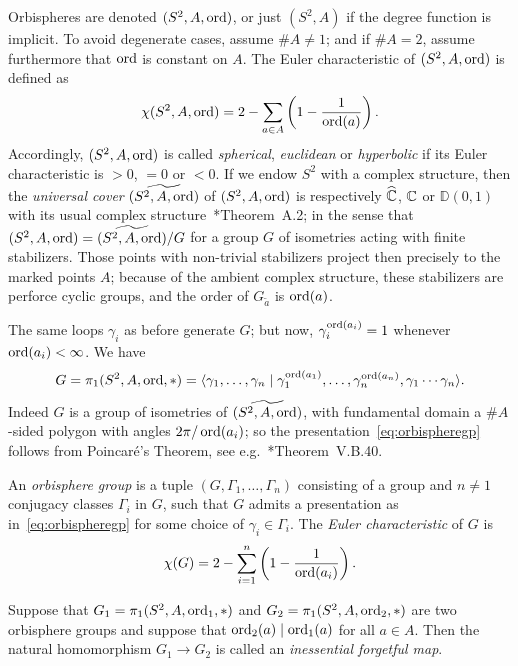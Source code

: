 \documentclass{amsart}
\begin{document}
Orbispheres are denoted $(S^2,A,\operatorname{ord})$, or just $(S^2,A)$ if the
degree function is implicit. To avoid degenerate cases, assume
$\#A\neq1$; and if $\#A=2$, assume furthermore that $\operatorname{ord}$ is constant
on $A$. The Euler characteristic of $(S^2,A,\operatorname{ord})$ is defined as
\[\chi(S^2,A,\operatorname{ord})=2-\sum_{a\in A}\left(1-\frac1{\operatorname{ord}(a)}\right).\]
Accordingly, $(S^2,A,\operatorname{ord})$ is called \emph{spherical},
\emph{euclidean} or \emph{hyperbolic} if its Euler characteristic is
$>0$, $=0$ or $<0$. If we endow $S^2$ with a complex
structure, then the \emph{universal cover} $\widetilde{(S^2,A,\operatorname{ord})}$
of $(S^2,A,\operatorname{ord})$ is respectively ${\widehat{{\mathbb C}}}$, ${\mathbb C}$ or $\mathbb D(0,1)$ with
its usual complex
structure~\cite{mcmullen:renormalization}*{Theorem~A.2}; in the sense
that $(S^2,A,\operatorname{ord})=\widetilde{(S^2,A,\operatorname{ord})}/G$ for a group $G$ of
isometries acting with finite stabilizers. Those points with
non-trivial stabilizers project then precisely to the marked points
$A$; because of the ambient complex structure, these stabilizers are
perforce cyclic groups, and the order of $G_{\widetilde a}$ is
$\operatorname{ord}(a)$.

The same loops $\gamma_i$ as before generate $G$; but now,
$\gamma_i^{\operatorname{ord}(a_i)}=1$ whenever $\operatorname{ord}(a_i)<\infty$. We have
\begin{equation}\label{eq:orbispheregp}
  G=\pi_1(S^2,A,\operatorname{ord},*)=\langle \gamma_1,\dots,\gamma_n\mid \gamma_1^{\operatorname{ord}(a_1)},\dots,\gamma_n^{\operatorname{ord}(a_n)}, \gamma_1\cdots\gamma_n\rangle.
\end{equation}
Indeed $G$ is a group of isometries of $\widetilde{(S^2,A,\operatorname{ord})}$, with
fundamental domain a $\#A$-sided polygon with angles $2\pi/\operatorname{ord}(a_i)$;
so the presentation~\eqref{eq:orbispheregp} follows from Poincar\'e's
Theorem, see e.g.~\cite{harpe:ggt}*{Theorem~V.B.40}.

\begin{defn}
  An \emph{orbisphere group} is a tuple $(G,\Gamma_1,\dots,\Gamma_n)$
  consisting of a group and $n\neq 1$ conjugacy classes $\Gamma_i$ in
  $G$, such that $G$ admits a presentation as
  in~\eqref{eq:orbispheregp} for some choice of
  $\gamma_i\in\Gamma_i$. The \emph{Euler characteristic} of $G$ is
  \[\chi(G)=2-\sum_{i=1}^n\left(1-\frac1{\operatorname{ord}(a_i)}\right).\] 
  
  Suppose that $G_1=\pi_1(S^2,A,\operatorname{ord}_1,*)$ and
  $G_2=\pi_1(S^2,A,\operatorname{ord}_2,*)$ are two orbisphere groups and suppose
  that $\operatorname{ord}_2(a)\mid \operatorname{ord}_1(a)$ for all $a\in A$. Then the natural
  homomorphism $G_1\to G_2$ is called an \emph{inessential forgetful
    map}.
\end{defn}
\end{document}
